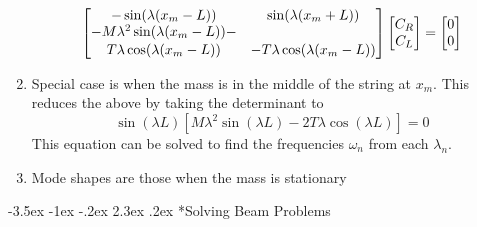\documentclass[letterpaper,twocolumn,notitlepage]{article}
\makeatletter
\renewcommand\subsection{\@startsection{section}{1}{\z@}%
 {-3.5ex \@plus-1ex \@minus-.2ex}%
 {2.3ex \@plus.2ex}%
 {\fontsize{8pt}{8pt}\selectfont\sffamily}}
\makeatother
\begin{document}
\begin{enumerate}
\begin{equation*}
\begin{bmatrix}
        -\sin(\lambda(x_{m}-L)) & \sin(\lambda(x_{m}+L)) \\
        \shortstack{$-M\lambda^{2}\sin(\lambda(x_{m}-L))-$ \\ $T\lambda\cos(\lambda(x_{m}-L))$} & -T\lambda\cos(\lambda(x_{m}-L))
      \end{bmatrix}
      \begin{bmatrix}
        C_{R} \\
        C_{L}
      \end{bmatrix}=
      \begin{bmatrix}
        0 \\
        0
      \end{bmatrix}
    \end{equation*}
    \item{%
      Special case is when the mass is in the middle of the string at $x_{m}$.
      This reduces the above by taking the determinant to
    }
    \begin{equation*}
      \sin(\lambda L)\left[M\lambda^{2}\sin(\lambda L)-2T\lambda\cos(\lambda L)\right]=0
    \end{equation*}
    This equation can be solved to find the frequencies $\omega_{n}$ from each $\lambda_{n}$.
    \item{Mode shapes are those when the mass is stationary}
  \end{enumerate}

  \subsection*{Solving Beam Problems}
\end{document}
